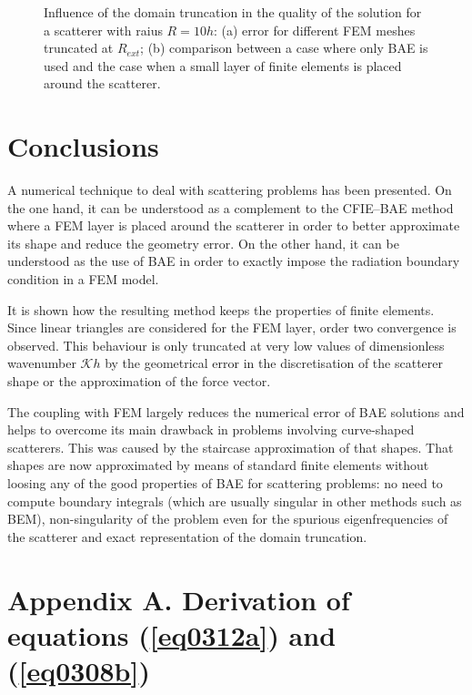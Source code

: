 \documentclass[12pt]{article}
\newcommand{\K}{\mathcal{K}}
\begin{document}
\begin{figure}[ht]
 
\caption{Influence of the domain truncation in the quality of the solution for a scatterer with raius $R = 10h$: (a) error for different FEM meshes truncated at $R_{ext}$; (b) comparison between a case where only BAE is used and the case when a small layer of finite elements is placed around the scatterer.}
\label{fig:InfluenceOfBoxSize}
\end{figure}



\section{Conclusions}
\label{sec:conclusions}

A numerical technique to deal with scattering problems has been presented. On the one hand, it can be understood as a complement to the CFIE--BAE method where a FEM layer is placed around the scatterer in order to better approximate its shape and reduce the geometry error. On the other hand, it can be understood as the use of BAE in order to exactly impose the radiation boundary condition in a FEM model.

It is shown how the resulting method keeps the properties of finite elements. Since linear triangles are considered for the FEM layer, order two convergence is observed. This behaviour is only truncated at very low values of dimensionless wavenumber $\K h$ by the geometrical error in the discretisation of the scatterer shape or the approximation of the force vector.

The coupling with FEM largely reduces the numerical error of BAE solutions and helps to overcome its main drawback in problems involving curve-shaped scatterers. This was caused by the staircase approximation of that shapes. That shapes are now approximated by means of standard finite elements without loosing any of the good properties of BAE for scattering problems: no need to compute boundary integrals (which are usually singular in other methods such as BEM), non-singularity of the problem even for the spurious eigenfrequencies of the scatterer and exact representation of the domain truncation.



\appendix
\section{Appendix A. Derivation of equations (\ref{eq0312a}) and (\ref{eq0308b})}
\label{sec:AppA}
\end{document}

